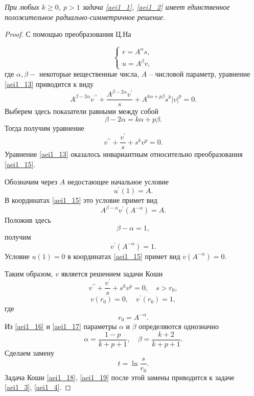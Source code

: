 \begin{theorem}
\textit{ При любых $ k \geq 0$, $p>1 $ задача \eqref{aei1_1}, \eqref{aei1_2} имеет
единственное положительное радиально-симметричное решение.}
\end{theorem}

\begin{proof}
С помощью преобразования Ц.На \cite{aeiL_14}

\begin{equation}\label{aei1_15}
\left \{
\begin{array}{l}
 r =A^{\alpha}s, \\
 u =A^{\beta}v,
\end{array} \right.
\end{equation}
где $ \alpha,\beta- $ некоторые вещественные числа, $ A$  -- числовой
параметр, уравнение \eqref{aei1_13} приводится к виду
$$
A^{\beta-2\alpha}v^{\prime\prime}+\frac{A^{\beta-2\alpha}v^{\prime}}{s}+A^{k\alpha+p\beta}s^k|v|^p=0.
$$
Выберем здесь показатели   равными между собой
\begin{equation}\label{aei1_16}
\beta-2\alpha=k\alpha+p\beta.
\end{equation}
Тогда получим уравнение
$$
v^{\prime\prime}+\frac{v^{\prime}}{s}+s^kv^p=0.
$$
Уравнение \eqref{aei1_13} оказалось инвариантным относительно преобразования
\eqref{aei1_15}.

Обозначим через $ A $  недостающее начальное условие
$$
u^{\prime}(1)=A.
$$
В координатах \eqref{aei1_15} это условие примет вид
$$
A^{\beta-\alpha}v^{\prime}(A^{-\alpha})=A.
$$
Положив здесь
\begin{equation}\label{aei1_17}
\beta-\alpha=1,
\end{equation}
получим
$$
v^{\prime}(A^{-\alpha})=1.
$$
Условие $ u(1)=0 $ в координатах \eqref{aei1_15}  примет вид $
v(A^{-\alpha})=0$.

Таким образом, $ v $  является решением задачи Коши
\begin{equation}\label{aei1_18}
v^{\prime\prime}+\frac{v^{\prime}}{s}+s^kv^p=0, \quad s>r_0,
\end{equation}
\begin{equation}\label{aei1_19}
v(r_0)=0, \quad v^{\prime}(r_0)=1,
\end{equation}
где
\begin{equation}\label{aei1_20}
r_0=A^{-\alpha}.
\end{equation}
Из \eqref{aei1_16} и \eqref{aei1_17} параметры $\alpha $   и $ \beta $  определяются однозначно
$$
\alpha=\frac{1-p}{k+p+1}, \quad \beta=\frac{k+2}{k+p+1}.
$$
Сделаем замену
\begin{equation}\label{aei1_21}
t=\ln{\frac{s}{r_0}}.
\end{equation}
Задача Коши \eqref{aei1_18}, \eqref{aei1_19} после этой замены приводится к задаче \eqref{aei1_3},
\eqref{aei1_4}.


\end{proof}

